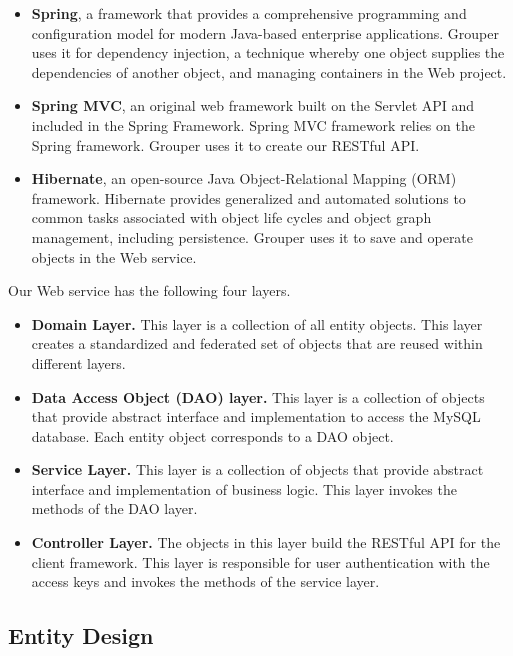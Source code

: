 \documentclass[a4paper,11pt]{report}
\begin{document}
\begin{itemize}[leftmargin=7mm]
	\setlength{\itemsep}{1pt}
	\setlength{\parskip}{0pt}
	\setlength{\parsep}{0pt}
	\item 
	\textbf{Spring}\cite{spring}, a framework that provides a comprehensive programming and configuration model for modern Java-based enterprise applications.
	Grouper uses it for dependency injection, a technique whereby one object supplies the dependencies of another object, and managing containers in the Web project.
	\item 
	\textbf{Spring MVC}\cite{spring}, an original web framework built on the Servlet API and included in the Spring Framework.
	Spring MVC framework relies on the Spring framework.
	Grouper uses it to create our RESTful API.
	\item 
	\textbf{Hibernate}\cite{hibernate}, an open-source Java Object-Relational Mapping (ORM) framework.
	Hibernate provides generalized and automated solutions to common tasks associated with object life cycles and object graph management, including persistence. 
	Grouper uses it to save and operate objects in the Web service.
\end{itemize}

Our Web service has the following four layers.

\begin{itemize}[leftmargin=7mm]
	\setlength{\itemsep}{1pt}
	\setlength{\parskip}{0pt}
	\setlength{\parsep}{0pt}
	\item 
	\textbf{Domain Layer.}
	This layer is a collection of all entity objects.
	This layer creates a standardized and federated set of objects that are reused within different layers.
	\item 
	\textbf{Data Access Object (DAO) layer.}
	This layer is a collection of objects that provide abstract interface and implementation to access the MySQL database. 
	Each entity object corresponds to a DAO object.
	\item 
	\textbf{Service Layer.}
	This layer is a collection of objects that provide abstract interface and implementation of business logic.
	This layer invokes the methods of the DAO layer.
	\item 
	\textbf{Controller Layer.}
	The objects in this layer build the RESTful API for the client framework.
	This layer is responsible for user authentication with the access keys and invokes the methods of the service layer.
\end{itemize}

\subsection{Entity Design}
\end{document}

